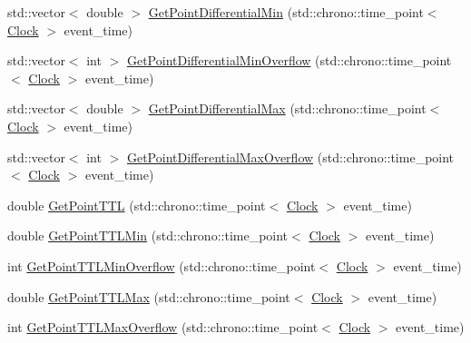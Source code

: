 \begin{DoxyCompactItemize}
\item 
std\+::vector$<$ double $>$ \mbox{\hyperlink{classPoint_a782860849006b601600f8df15af23f7a}{Get\+Point\+Differential\+Min}} (std\+::chrono\+::time\+\_\+point$<$ \mbox{\hyperlink{universe_8h_a0ef8d951d1ca5ab3cfaf7ab4c7a6fd80}{Clock}} $>$ event\+\_\+time)
\item 
std\+::vector$<$ int $>$ \mbox{\hyperlink{classPoint_adbc225afbd532763617db1acdb81ef4c}{Get\+Point\+Differential\+Min\+Overflow}} (std\+::chrono\+::time\+\_\+point$<$ \mbox{\hyperlink{universe_8h_a0ef8d951d1ca5ab3cfaf7ab4c7a6fd80}{Clock}} $>$ event\+\_\+time)
\item 
std\+::vector$<$ double $>$ \mbox{\hyperlink{classPoint_a326cd5742e908f8fb3cf6f3275b5462c}{Get\+Point\+Differential\+Max}} (std\+::chrono\+::time\+\_\+point$<$ \mbox{\hyperlink{universe_8h_a0ef8d951d1ca5ab3cfaf7ab4c7a6fd80}{Clock}} $>$ event\+\_\+time)
\item 
std\+::vector$<$ int $>$ \mbox{\hyperlink{classPoint_a2d38599722fbf65afe2b9ac57b0c4bcf}{Get\+Point\+Differential\+Max\+Overflow}} (std\+::chrono\+::time\+\_\+point$<$ \mbox{\hyperlink{universe_8h_a0ef8d951d1ca5ab3cfaf7ab4c7a6fd80}{Clock}} $>$ event\+\_\+time)
\item 
double \mbox{\hyperlink{classPoint_a72cf99a391fc3d6ea8f4252f4f92c19f}{Get\+Point\+T\+TL}} (std\+::chrono\+::time\+\_\+point$<$ \mbox{\hyperlink{universe_8h_a0ef8d951d1ca5ab3cfaf7ab4c7a6fd80}{Clock}} $>$ event\+\_\+time)
\item 
double \mbox{\hyperlink{classPoint_a272b99a9cd054b09c8944b9f0e657890}{Get\+Point\+T\+T\+L\+Min}} (std\+::chrono\+::time\+\_\+point$<$ \mbox{\hyperlink{universe_8h_a0ef8d951d1ca5ab3cfaf7ab4c7a6fd80}{Clock}} $>$ event\+\_\+time)
\item 
int \mbox{\hyperlink{classPoint_a72b222f880df30ebcc12ddc1a6d430b5}{Get\+Point\+T\+T\+L\+Min\+Overflow}} (std\+::chrono\+::time\+\_\+point$<$ \mbox{\hyperlink{universe_8h_a0ef8d951d1ca5ab3cfaf7ab4c7a6fd80}{Clock}} $>$ event\+\_\+time)
\item 
double \mbox{\hyperlink{classPoint_a0800eea77109f6fbb1220b4d551a70d3}{Get\+Point\+T\+T\+L\+Max}} (std\+::chrono\+::time\+\_\+point$<$ \mbox{\hyperlink{universe_8h_a0ef8d951d1ca5ab3cfaf7ab4c7a6fd80}{Clock}} $>$ event\+\_\+time)
\item 
int \mbox{\hyperlink{classPoint_a61d7e0fb0fd0280f628ea46609082809}{Get\+Point\+T\+T\+L\+Max\+Overflow}} (std\+::chrono\+::time\+\_\+point$<$ \mbox{\hyperlink{universe_8h_a0ef8d951d1ca5ab3cfaf7ab4c7a6fd80}{Clock}} $>$ event\+\_\+time)
\item 

\end{DoxyCompactItemize}
